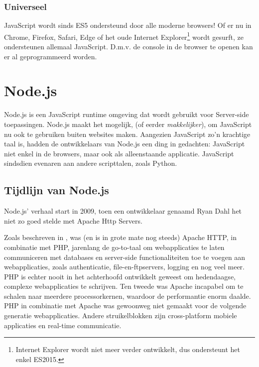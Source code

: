 \subsubsection{Universeel}
\label{sec:universal}

JavaScript wordt sinds ES5 ondersteund door alle moderne browsers! Of er nu in Chrome, Firefox, Safari, Edge of het oude Internet Explorer\footnote{Internet Explorer wordt niet meer verder ontwikkelt, dus ondersteunt het enkel ES2015.} wordt gesurft, ze ondersteunen allemaal JavaScript. D.m.v. de console in de browser te openen kan er al geprogrammeerd worden.





\section{Node.js}
\label{sec:nodeJs}

Node.js is een JavaScript runtime omgeving dat wordt gebruikt voor Server-side toepassingen. Node.js maakt het mogelijk, (of eerder \textit{makkelijker}), om JavaScript nu ook te gebruiken buiten websites maken. Aangezien JavaScript zo'n krachtige taal is, hadden de ontwikkelaars van Node.js een ding in gedachten: JavaScript niet enkel in de browsers, maar ook als alleenstaande applicatie. JavaScript sindsdien evenaren aan andere scripttalen, zoals Python. \textcite{Patel2018}

\subsection{Tijdlijn van Node.js}
\label{sec:nodeTimeline}
Node.js' verhaal start in 2009, toen een ontwikkelaar genaamd Ryan Dahl het niet zo goed stelde met Apache Http Servers. 

Zoals beschreven in \autocite{Chaniotis2015}, was (en is in grote mate nog steeds) Apache HTTP, in combinatie met PHP, jarenlang de go-to-taal om webapplicaties te laten communiceren met databases en server-side functionaliteiten toe te voegen aan webapplicaties, zoals authenticatie, file-en-ftpservers, logging en nog veel meer. PHP is echter nooit in het achterhoofd ontwikkelt geweest om hedendaagse, complexe webapplicaties te schrijven. Ten tweede was Apache incapabel om te schalen naar meerdere processorkernen, waardoor de performantie enorm daalde. PHP in combinatie met Apache was gewoonweg niet gemaakt voor de volgende generatie webapplicaties. Andere struikelblokken zijn cross-platform mobiele applicaties en real-time communicatie.

